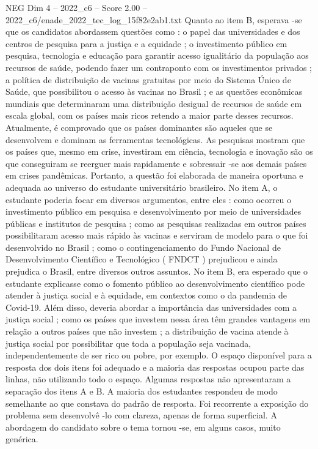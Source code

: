 \begin{textsample}{NEG Dim 4 – 2022\_c6 – Score 2.00 – 2022\_c6/enade\_2022\_tec\_log\_15f82e2ab1.txt}
Quanto ao item B, esperava -se que os candidatos abordassem questões como : o papel das universidades e dos centros de pesquisa para a justiça e a equidade ; o investimento público em pesquisa, tecnologia e educação para garantir acesso igualitário da população aos recursos de saúde, podendo fazer um contraponto com os investimentos privados ; a política de distribuição de vacinas gratuitas por meio do Sistema Único de Saúde, que possibilitou o acesso às vacinas no Brasil ; e as questões econômicas mundiais que determinaram uma distribuição desigual de recursos de saúde em escala global, com os países mais ricos retendo a maior parte desses recursos.
Atualmente, é comprovado que os países dominantes são aqueles que se desenvolvem e dominam as ferramentas tecnológicas.
As pesquisas mostram que os países que, mesmo em crise, investiram em ciência, tecnologia e inovação são os que conseguiram se reerguer mais rapidamente e sobressair -se aos demais países em crises pandêmicas.
Portanto, a questão foi elaborada de maneira oportuna e adequada ao universo do estudante universitário brasileiro.
No item A, o estudante poderia focar em diversos argumentos, entre eles : como ocorreu o investimento público em pesquisa e desenvolvimento por meio de universidades públicas e institutos de pesquisa ; como as pesquisas realizadas em outros países possibilitaram acesso mais rápido às vacinas e serviram de modelo para o que foi desenvolvido no Brasil ; como o contingenciamento do Fundo Nacional de Desenvolvimento Científico e Tecnológico ( FNDCT ) prejudicou e ainda prejudica o Brasil, entre diversos outros assuntos.
No item B, era esperado que o estudante explicasse como o fomento público ao desenvolvimento científico pode atender à justiça social e à equidade, em contextos como o da pandemia de Covid-19.
Além disso, deveria abordar a importância das universidades com a justiça social ; como os países que investem nessa área têm grandes vantagens em relação a outros países que não investem ; a distribuição de vacina atende à justiça social por possibilitar que toda a população seja vacinada, independentemente de ser rico ou pobre, por exemplo.
O espaço disponível para a resposta dos dois itens foi adequado e a maioria das respostas ocupou parte das linhas, não utilizando todo o espaço.
Algumas respostas não apresentaram a separação dos itens A e B.
A maioria dos estudantes respondeu de modo semelhante ao que constava do padrão de resposta.
Foi recorrente a exposição do problema sem desenvolvê -lo com clareza, apenas de forma superficial.
A abordagem do candidato sobre o tema tornou -se, em alguns casos, muito genérica.

\end{textsample}
